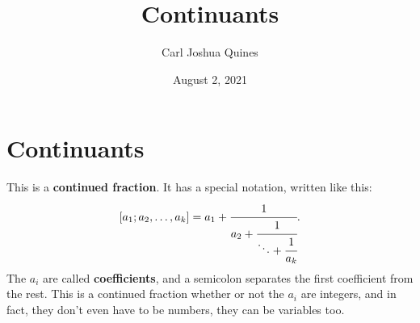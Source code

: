 \documentclass[11pt,paper=letter]{scrartcl}
\begin{document}
\title{Continuants}
\author{Carl Joshua Quines}
\date{August 2, 2021}

\maketitle

\section{Continuants}

This is a \textbf{continued fraction}. It has a special notation, written like this:  \[
  [a_1; a_2, \ldots, a_k] =
  a_1 + \cfrac{1}{
    a_2 + \cfrac{1}{
      \ddots + \cfrac{1}{a_k}
    }
  }.
\]
The $a_i$ are called \textbf{coefficients}, and a semicolon separates the first coefficient from the rest. This is a continued fraction whether or not the $a_i$ are integers, and in fact, they don't even have to be numbers, they can be variables too.
\end{document}
